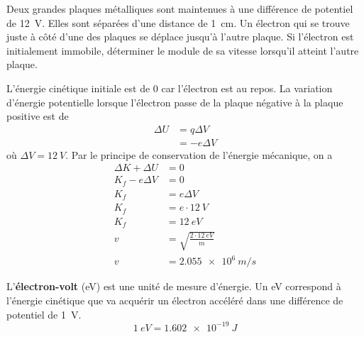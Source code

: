 \begin{diapobox}

  Deux grandes plaques métalliques sont maintenues à une différence de potentiel
  de \SI{12}{V}. Elles sont séparées d'une distance de \SI{1}{cm}. Un électron
  qui se trouve juste à côté d'une des plaques se déplace jusqu'à l'autre plaque.
  Si l'électron est initialement immobile, déterminer le module de sa vitesse
  lorsqu'il atteint l'autre plaque.

  \begin{center}
  \end{center}
\end{diapobox}

\begin{reponsebox}
L'énergie cinétique initiale est de $0$ car l'électron est au repos. La
variation d'énergie potentielle lorsque l'électron passe de la plaque négative
à la plaque positive est de
\begin{align*}
  \Delta U &= q \Delta V \\
           &= -e \Delta V
\end{align*}
où $\Delta V = \SI{12}{V}$. Par le principe de conservation de l'énergie
mécanique, on a
\begin{align*}
  \Delta K + \Delta U &= 0  \\
      K_f - e\Delta V &= 0  \\
      K_f &= e\Delta V     \\
      K_f &= e \cdot \SI{12}{V}  \\
      K_f &= \SI{12}{eV}   \\
        v &= \sqrt{\frac{2 \cdot \SI{12}{eV}}{m}}  \\
        v &= \SI{2.055e6}{m/s}
\end{align*}
\end{reponsebox}



L'\textbf{électron-volt} (\si{eV}) est une unité de mesure d'énergie. Un
\si{eV} correspond à l'énergie cinétique que va acquérir un électron accéléré
dans une différence de potentiel de \SI{1}{V}.
\[
    \SI{1}{eV} = \SI{1.602e-19}{J}
\]


